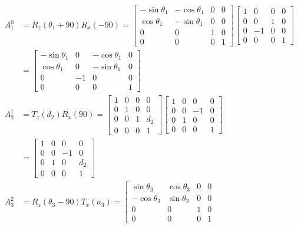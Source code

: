 \documentclass[twoside,11pt]{homework}
\begin{document}
\begin{equation}
\begin{split}
A_1^0 &= R_z(\theta_1+90)R_x(-90) = \left[
\begin{matrix}
-\sin \theta_1 & -\cos \theta_1 & 0 & 0 \\
\cos \theta_1 & -\sin \theta_1 & 0 & 0 \\
0 & 0 & 1 & 0 \\
0 & 0 & 0 & 1
\end{matrix}
\right]
\begin{bmatrix}
1 & 0 & 0 & 0 \\
0 & 0 & 1 & 0 \\
0 & -1 & 0 & 0 \\
0 & 0 & 0 & 1 
\end{bmatrix}
\\
&= \left[
\begin{matrix}
-\sin \theta_1 & 0 & -\cos \theta_1 & 0  \\
\cos \theta_1 & 0 & -\sin \theta_1 & 0 \\
0 & -1 & 0 & 0 \\
0 & 0 & 0 & 1
\end{matrix}
\right]
\\
A_2^1 &= T_z(d_2)R_x(90) =
\begin{bmatrix}
1 & 0 & 0 & 0 \\
0 & 1 & 0& 0 \\
0 & 0 & 1 & d_2 \\
0 & 0 & 0 & 1 
\end{bmatrix}
\begin{bmatrix}
1 & 0 & 0 & 0 \\
0 & 0 & -1 & 0 \\
0 & 1 & 0 & 0 \\
0 & 0 & 0 & 1 
\end{bmatrix}
\\
&= \begin{bmatrix}
1 & 0 & 0 & 0 \\
0 & 0 & -1& 0 \\
0 & 1 & 0 &d_2\\
0 & 0 & 0 & 1 
\end{bmatrix}
\\
A_3^2 &= R_z(\theta_3-90)T_x(a_3) = 
\left[
\begin{matrix}
\sin \theta_3 & \cos \theta_3 & 0 & 0 \\
-\cos \theta_3 & \sin \theta_3 & 0 & 0 \\
0 & 0 & 1 & 0 \\
0 & 0 & 0 & 1
\end{matrix}

\end{split}
\end{equation}
\end{document}
